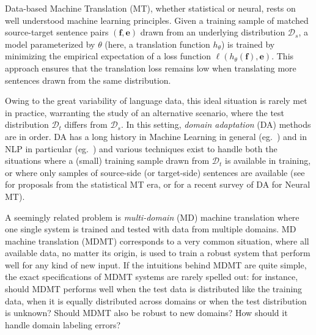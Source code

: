 \documentclass[11pt,a4paper]{article}
\newcommand{\fyDone}[1]{\done[FY]\Todo[FY:]{\textcolor{orange}{#1}}}
\newcommand{\jcDone}[1]{\done[JC]\Todo[JC:]{\textcolor{blue}{#1}}}
\newcommand{\src}{\ensuremath{\mathbf{f}}} %
\newcommand{\trg}{\ensuremath{\mathbf{e}}} %
\begin{document}
Data-based Machine Translation (MT), whether statistical or neural, rests on well understood machine learning principles. Given a training sample of matched source-target sentence pairs $(\src,\trg)$\jcDone{shoulnt trg be e as below ?} drawn from an underlying distribution $\mathcal{D}_s$, a model parameterized by $\theta$ (here, a translation function $h_{\theta}$) is trained by minimizing the empirical expectation of a loss function $\ell(h_\theta(\src), \trg)$. This approach ensures that the translation loss remains low when translating more sentences drawn from the same distribution.

Owing to the great variability of language data, this ideal situation is rarely met in practice, warranting the study of an alternative scenario, where the test distribution $\mathcal{D}_t$ differs from $\mathcal{D}_s$. In this setting, \emph{domain adaptation} (DA) methods are in order. DA has a long history in Machine Learning in general (eg.\ \cite{Shimodaira00improving,Ben-David09atheory, Quinonero08dataset,Pan10asurvey})\fyDone{cite non covariate shift} and in NLP in particular (eg.\ \cite{Daume06domain,Blitzer07domain,Jiang07instance}) and various techniques exist to handle both the situations where a (small) training sample drawn from $\mathcal{D}_t$ is available in training, or where only samples of source-side (or target-side) sentences are available (see \cite{Foster07mixture,Bertoldi09domain,Axelrod11domain} for proposals from the statistical MT era, or \cite{Chu18asurvey} for a recent survey of DA for Neural MT).

A seemingly related problem is \emph{multi-domain} (MD) machine translation \cite{Sajjad17neural,Farajian17multidomain,Kobus17domaincontrol,Zeng18multidomain,Pham19generic} where one single system is trained and tested with data from multiple domains. MD machine translation (MDMT) corresponds to a very common situation, where all available data, no matter its origin, is used to train a robust system that perform well for any kind of new input.
If the intuitions behind MDMT are quite simple, the exact specifications of MDMT systems are rarely spelled out: for instance, should MDMT performs well when the test data is distributed like the training data, when it is equally distributed across domains or when the test distribution is unknown? Should MDMT also be robust to new domains? How should it handle domain labeling errors? %
\end{document}
